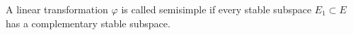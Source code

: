 A linear transformation $\varphi$ is called semisimple if every stable subspace $E_1 \subset E$ has a complementary stable subspace.
